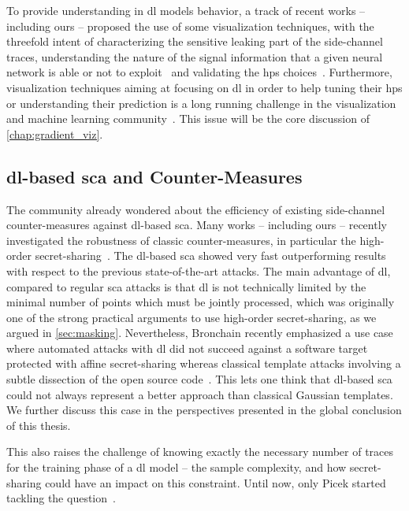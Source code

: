 To provide understanding in \gls{dl} models behavior, a track of recent works -- including ours -- proposed the use of some visualization techniques, with the threefold intent of characterizing the sensitive leaking part of the side-channel traces, understanding the nature of the signal information that a given neural network is able or not to exploit~\cite{masure_gradient_2019,hettwer_deep_2019,timon_non-profiled_2019,vanDerValk_kilroy_2019} and validating the \glspl{hp} choices~\cite{zaid_methodology_2019}.
Furthermore, visualization techniques aiming at focusing on \gls{dl} in order to help tuning their \glspl{hp} or understanding their prediction is a long running challenge in the visualization and machine learning community~\cite{hohman_visual_2019,garcia_task_2018}.
This issue will be the core discussion of \autoref{chap:gradient_viz}.

\subsection{\gls{dl}-based \gls{sca} and Counter-Measures}
The community already wondered about the efficiency of existing side-channel counter-measures against \gls{dl}-based \gls{sca}. 
Many works -- including ours -- recently investigated the robustness of classic counter-measures, in particular the high-order secret-sharing~\cite{maghrebi_breaking_2016,prouff_study_2018,kim_make_2019,timon_non-profiled_2019,maghrebi_deep_2019,masure_comprehensive_2019,zhou_deep_2019,bronchain_dissection_2020}.
The \gls{dl}-based \gls{sca} showed very fast outperforming results with respect to the previous state-of-the-art attacks.
The main advantage of \gls{dl}, compared to regular \gls{sca} attacks is that \gls{dl} is not technically limited by the minimal number of points which must be jointly processed, which was originally one of the strong practical arguments to use high-order secret-sharing, as we argued in \autoref{sec:masking}.
Nevertheless, Bronchain \etal{} recently emphasized a use case where automated attacks with \gls{dl} did not succeed against a software target protected with affine secret-sharing whereas classical template attacks involving a subtle dissection of the open source code~\cite{bronchain_dissection_2020}.
This lets one think that \gls{dl}-based \gls{sca} could not always represent a better approach than classical Gaussian templates.
We further discuss this case in the perspectives presented in the global conclusion of this thesis.


This also raises the challenge of knowing exactly the necessary number of traces for the training phase of a \gls{dl} model -- \ie{} the sample complexity, and how secret-sharing could have an impact on this constraint. 
Until now, only Picek \etal{} started tackling the question~\cite{picek_profiling_2019}. 

